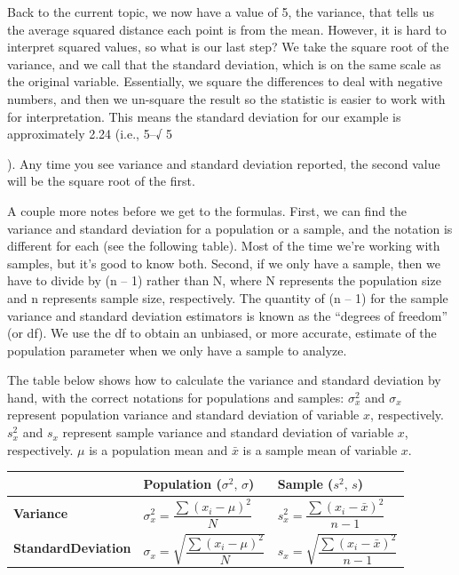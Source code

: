 \documentclass[
  letterpaper,
  DIV=11,
  numbers=noendperiod]{scrreprt}
\begin{document}
Back to the current topic, we now have a value of 5, the variance, that
tells us the average squared distance each point is from the mean.
However, it is hard to interpret squared values, so what is our last
step? We take the square root of the variance, and we call that the
standard deviation, which is on the same scale as the original variable.
Essentially, we square the differences to deal with negative numbers,
and then we un-square the result so the statistic is easier to work with
for interpretation. This means the standard deviation for our example is
approximately 2.24 (i.e., 5--√ 5

). Any time you see variance and standard deviation reported, the second
value will be the square root of the first.

A couple more notes before we get to the formulas. First, we can find
the variance and standard deviation for a population or a sample, and
the notation is different for each (see the following table). Most of
the time we're working with samples, but it's good to know both. Second,
if we only have a sample, then we have to divide by (n -- 1) rather than
N, where N represents the population size and n represents sample size,
respectively. The quantity of (n -- 1) for the sample variance and
standard deviation estimators is known as the ``degrees of freedom'' (or
df). We use the df to obtain an unbiased, or more accurate, estimate of
the population parameter when we only have a sample to analyze.

The table below shows how to calculate the variance and standard
deviation by hand, with the correct notations for populations and
samples: \(σ_x^2\) and \(σ_x\) represent population variance and
standard deviation of variable \(x\), respectively. \(s_x^2\) and
\(s_x\) represent sample variance and standard deviation of variable
\(x\), respectively. \(\mu\) is a population mean and \(\bar{x}\) is a
sample mean of variable \(x\).

\begin{longtable}[]{@{}
  >{\raggedright\arraybackslash}p{}
  >{\raggedright\arraybackslash}p{}
  >{\raggedright\arraybackslash}p{}@{}}
\toprule\noalign{}
\begin{minipage}[b]{\linewidth}\raggedright
\end{minipage} & \begin{minipage}[b]{\linewidth}\raggedright
Population (\(\sigma^2,\,\sigma\))
\end{minipage} & \begin{minipage}[b]{\linewidth}\raggedright
Sample (\(s^2,\,s\))
\end{minipage} \\
\midrule\noalign{}
\endhead
\bottomrule\noalign{}
\endlastfoot
\textbf{Variance} & \(\sigma_x^2=\dfrac{\sum (x_i-\mu)^2}{N}\) &
\(s_x^2=\dfrac{\sum (x_i-\bar{x})^2}{n-1}\) \\
\textbf{StandardDeviation} &
\(\sigma_x=\sqrt{\dfrac{\sum (x_i-\mu)^2}{N}}\) &
\(s_x=\sqrt{\dfrac{\sum (x_i-\bar{x})^2}{n-1}}\) \\
\end{longtable}
\end{document}
